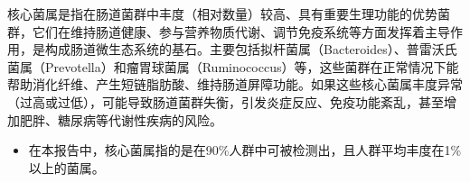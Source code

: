 \documentclass[UTF8]{ctexart}
\begin{document}
\begin{tcolorbox}[
    enhanced,
    colback=customTeal!15,
    colframe=customTealBg,
    arc=3mm,
    boxrule=0pt,
    width=\textwidth,
    top=8pt,
    bottom=8pt
]
{\normalsize{\color{customTeal}\faInfoCircle} 核心菌属是指在肠道菌群中丰度（相对数量）较高、具有重要生理功能的优势菌群，它们在维持肠道健康、参与营养物质代谢、调节免疫系统等方面发挥着主导作用，是构成肠道微生态系统的基石。主要包括拟杆菌属（Bacteroides）、普雷沃氏菌属（Prevotella）和瘤胃球菌属（Ruminococcus）等，这些菌群在正常情况下能帮助消化纤维、产生短链脂肪酸、维持肠道屏障功能。如果这些核心菌属丰度异常（过高或过低），可能导致肠道菌群失衡，引发炎症反应、免疫功能紊乱，甚至增加肥胖、糖尿病等代谢性疾病的风险。
\begin{itemize}
    \item 在本报告中，核心菌属指的是在90\%人群中可被检测出，且人群平均丰度在1\%以上的菌属。
\end{itemize}
}
\end{tcolorbox}
\vspace{-0.5cm}
\end{document}
